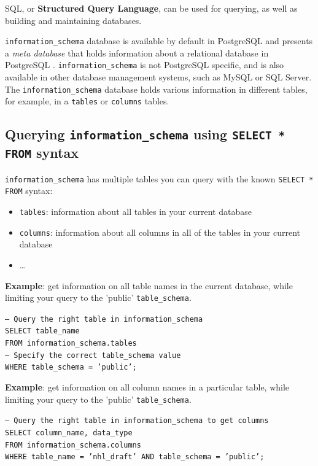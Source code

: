 \documentclass[11pt]{article}
\begin{document}
    SQL, or \textbf{Structured Query Language}, can be used for querying, as well as building and maintaining databases.

    \texttt{information\_schema} database is available by default in PostgreSQL and presents a \textit{meta database} that holds information about a relational database in PostgreSQL .
    \texttt{information\_schema} is not PostgreSQL specific, and is also available in other database management systems, such as MySQL or SQL Server.
    The \texttt{information\_schema} database holds various information in different tables, for example, in a \texttt{tables} or \texttt{columns} tables.

    \subsection{Querying \texttt{information\_schema} using \texttt{SELECT * FROM} syntax} \label{subsec:info_schema_q}

    \texttt{information\_schema} has multiple tables you can query with the known \texttt{SELECT * FROM} syntax:

    \begin{itemize}
        \item \texttt{tables}: information about all tables in your current database
        \item \texttt{columns}: information about all columns in all of the tables in your current database
        \item \ldots
    \end{itemize}

    \vspace{5mm}

    \textbf{Example}: get information on all table names in the current database, while limiting your query to the 'public' \texttt{table\_schema}.

    \vspace{5mm}

    \texttt{-- Query the right table in information\_schema \\
    SELECT table\_name \\
    FROM information\_schema.tables \\
    -- Specify the correct table\_schema value \\
    WHERE table\_schema = 'public';}

    \vspace{5mm}

    \textbf{Example}: get information on all column names in a particular table, while limiting your query to the 'public' \texttt{table\_schema}.

    \vspace{5mm}

    \texttt{-- Query the right table in information\_schema to get columns \\
    SELECT column\_name, data\_type \\
    FROM information\_schema.columns \\
    WHERE table\_name = 'nhl\_draft' AND table\_schema = 'public';}

    \medskip
    
    
\end{document}
